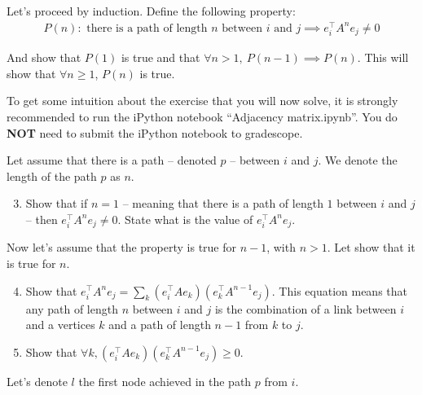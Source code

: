 Let's proceed by induction. Define the following property:
\begin{align}
    P(n) : \text{ there is a path of length } n \text{ between } i \text{ and } j \implies e_i^\top A^n e_j \neq 0
\end{align}


And show that $P(1)$ is true and that $\forall n>1,\ P(n-1)\implies P(n)$. This will show that $\forall n\geq 1$, $P(n)$ is true.


To get some intuition about the exercise that you will now solve, it is strongly recommended to run the iPython notebook ``Adjacency matrix.ipynb''.
You do \textbf{NOT} need to submit the iPython notebook to gradescope.

Let assume that there is a path -- denoted $p$ -- between $i$ and $j$. We denote the length of the path $p$ as $n$.

\begin{enumerate}
\setcounter{enumi}{2}
\item Show that if $n=1$ -- meaning that there is a path of length $1$ between $i$ and $j$ -- then $e_i^\top A^n e_j \neq 0$. State what is the value of $e_i^\top A^n e_j$.

\sol{}
\end{enumerate}

Now let's assume that the property is true for $n-1$, with $n>1$. Let show that it is true for $n$.

\begin{enumerate}
\setcounter{enumi}{3}
\item Show that $e_i^\top A^n e_j = \sum\limits_k (e_i^\top A e_k) (e_k^\top A^{n-1} e_j)$.
This equation means that any path of length $n$ between $i$ and $j$ is the combination of a link between $i$ and a vertices $k$ and a path of length $n-1$ from $k$ to $j$.

\sol{}
\item Show that $\forall k, (e_i^\top A e_k) (e_k^\top A^{n-1} e_j)\geq 0$.

\sol{}
\end{enumerate}

Let's denote $l$ the first node achieved in the path $p$ from $i$.

